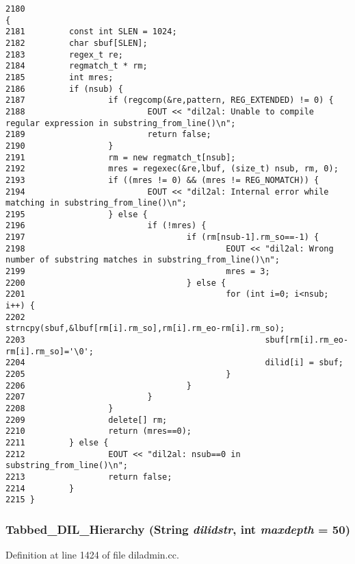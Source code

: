 \footnotesize\begin{verbatim}2180                                                                                             {
2181         const int SLEN = 1024;
2182         char sbuf[SLEN];
2183         regex_t re;
2184         regmatch_t * rm;
2185         int mres;
2186         if (nsub) {
2187                 if (regcomp(&re,pattern, REG_EXTENDED) != 0) {
2188                         EOUT << "dil2al: Unable to compile regular expression in substring_from_line()\n";
2189                         return false;
2190                 }
2191                 rm = new regmatch_t[nsub];
2192                 mres = regexec(&re,lbuf, (size_t) nsub, rm, 0);
2193                 if ((mres != 0) && (mres != REG_NOMATCH)) {
2194                         EOUT << "dil2al: Internal error while matching in substring_from_line()\n";
2195                 } else {
2196                         if (!mres) {
2197                                 if (rm[nsub-1].rm_so==-1) {
2198                                         EOUT << "dil2al: Wrong number of substring matches in substring_from_line()\n";
2199                                         mres = 3;
2200                                 } else {
2201                                         for (int i=0; i<nsub; i++) {
2202                                                 strncpy(sbuf,&lbuf[rm[i].rm_so],rm[i].rm_eo-rm[i].rm_so);
2203                                                 sbuf[rm[i].rm_eo-rm[i].rm_so]='\0';
2204                                                 dilid[i] = sbuf;
2205                                         }
2206                                 }
2207                         }
2208                 }
2209                 delete[] rm;
2210                 return (mres==0);
2211         } else {
2212                 EOUT << "dil2al: nsub==0 in substring_from_line()\n";
2213                 return false;
2214         }
2215 }
\end{verbatim}\normalsize 
{}
\subsubsection{ Tabbed\_\-DIL\_\-Hierarchy ({\bf String} {\em dilidstr}, int {\em maxdepth} = 50)}\label{dil2al_8hh_a312}




Definition at line 1424 of file diladmin.cc.

